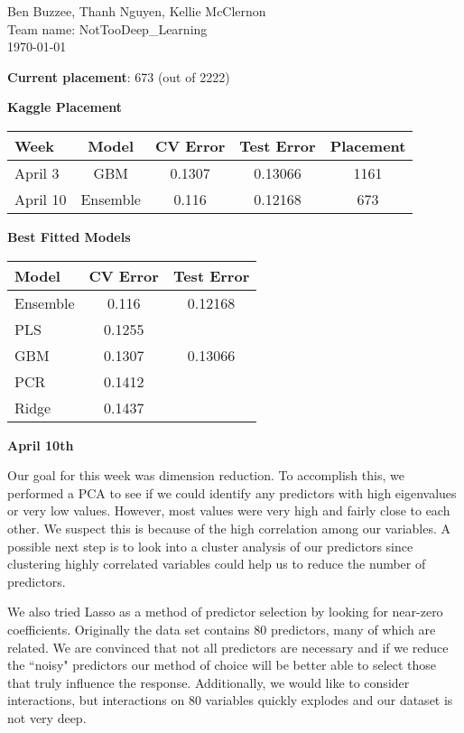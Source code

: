 \documentclass[12pt]{article}
\begin{document}
\noindent
Ben Buzzee, Thanh Nguyen, Kellie McClernon \\
Team name: NotTooDeep\_Learning \\
\today
\vspace{0.5 cm}

\textbf{Current placement}: 673 (out of 2222)

\textbf{Kaggle Placement}
\begin{center}
\begin{tabular}{l c c c c}
\hline
Week & Model & CV Error & Test Error & Placement \\
\hline
April 3 & GBM & 0.1307 & 0.13066 & 1161 \\
April 10 & Ensemble & 0.116 & 0.12168 & 673 \\
\hline
\end{tabular}
\end{center}

\textbf{Best Fitted Models}
\begin{center}
\begin{tabular}{l c c}
	\hline
	Model & CV Error & Test Error \\
	\hline
	Ensemble & 0.116 & 0.12168 \\
	PLS & 0.1255 & \\
	GBM & 0.1307 & 0.13066 \\
	PCR & 0.1412 & \\
	Ridge & 0.1437 & \\
	\hline
\end{tabular}
\end{center}

\textbf{April 10th}

Our goal for this week was dimension reduction.  To accomplish this, we performed a PCA to see if we could identify any predictors with high eigenvalues or very low values.  However, most values were very high and fairly close to each other.  We suspect this is because of the high correlation among our variables.  A possible next step is to look into a cluster analysis of our predictors since clustering highly correlated variables could help us to reduce the number of predictors.  %

We also tried Lasso as a method of predictor selection by looking for near-zero coefficients.  Originally the data set contains 80 predictors, many of which are related.  We are convinced that not all predictors are necessary and if we reduce the ``noisy" predictors our method of choice will be better able to select those that truly influence the response.  Additionally, we would like to consider interactions, but interactions on 80 variables quickly explodes and our dataset is not very deep.
\end{document}
